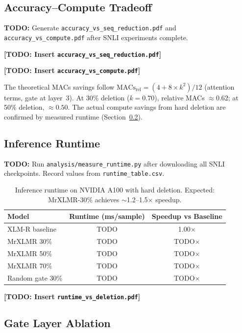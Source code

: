 \documentclass[11pt,a4paper]{article}
\newcommand{\todo}[1]{\begin{mdframed}[style=todostyle]\textcolor{todocolor}{\textbf{TODO:}} #1\end{mdframed}}
\begin{document}
\subsection{Accuracy--Compute Tradeoff}
\label{sec:tradeoff}

\todo{Generate \texttt{accuracy\_vs\_seq\_reduction.pdf} and \texttt{accuracy\_vs\_compute.pdf} after SNLI experiments complete.}

\textbf{[TODO: Insert \texttt{accuracy\_vs\_seq\_reduction.pdf}]}

\textbf{[TODO: Insert \texttt{accuracy\_vs\_compute.pdf}]}

The theoretical MACs savings follow $\text{MACs}_{\text{rel}} = (4 + 8 \times k^2) / 12$ (attention terms, gate at layer~3). At 30\% deletion ($k=0.70$), relative MACs $\approx 0.62$; at 50\% deletion, $\approx 0.50$. The actual compute savings from hard deletion are confirmed by measured runtime (Section~\ref{sec:runtime}).


\subsection{Inference Runtime}
\label{sec:runtime}

\todo{Run \texttt{analysis/measure\_runtime.py} after downloading all SNLI checkpoints. Record values from \texttt{runtime\_table.csv}.}

\begin{table}[h]
\centering
\begin{tabular}{@{}lcc@{}}
\toprule
\textbf{Model} & \textbf{Runtime (ms/sample)} & \textbf{Speedup vs Baseline} \\
\midrule
XLM-R baseline   & TODO & 1.00$\times$ \\
MrXLMR 30\%      & TODO & TODO$\times$ \\
MrXLMR 50\%      & TODO & TODO$\times$ \\
MrXLMR 70\%      & TODO & TODO$\times$ \\
Random gate 30\% & TODO & TODO$\times$ \\
\bottomrule
\end{tabular}
\caption{Inference runtime on NVIDIA A100 with hard deletion. Expected: MrXLMR-30\% achieves $\sim$1.2--1.5$\times$ speedup.}
\label{tab:runtime}
\end{table}

\textbf{[TODO: Insert \texttt{runtime\_vs\_deletion.pdf}]}


\subsection{Gate Layer Ablation}
\label{sec:gate-layer-ablation}
\end{document}
